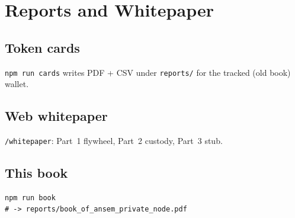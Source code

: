 \chapter{Reports and Whitepaper}

\section{Token cards}

\texttt{npm run cards} writes PDF + CSV under \texttt{reports/} for the tracked (old book) wallet.

\section{Web whitepaper}

\texttt{/whitepaper}: Part~1 flywheel, Part~2 custody, Part~3 stub.

\section{This book}

\begin{lstlisting}
npm run book
# -> reports/book_of_ansem_private_node.pdf
\end{lstlisting}
